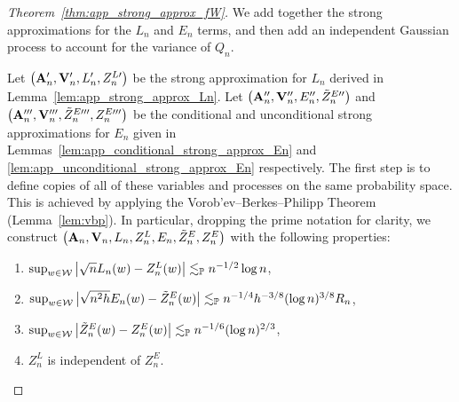 \begin{proof}[Theorem~\ref{thm:app_strong_approx_fW}]

  We add together the strong approximations
  for the $L_n$ and $E_n$ terms,
  and then add an independent Gaussian process
  to account for the variance of $Q_n$.


  Let $\big(\mathbf{A}_n', \mathbf{V}_n', L_n', Z_n^{L\prime}\big)$
  be the strong approximation for $L_n$
  derived in Lemma~\ref{lem:app_strong_approx_Ln}.
  Let $\big(\mathbf{A}_n'', \mathbf{V}_n'', E_n'', \tilde Z_n^{E\prime\prime}\big)$
  and
  $\big(\mathbf{A}_n''', \mathbf{V}_n''', \tilde Z_n^{E\prime\prime\prime}, Z_n^{E\prime\prime\prime}\big)$
  be the conditional and unconditional strong approximations for $E_n$
  given in Lemmas~\ref{lem:app_conditional_strong_approx_En}
  and \ref{lem:app_unconditional_strong_approx_En}
  respectively.
  The first step is to define copies of all of these variables
  and processes on the same probability space.
  This is achieved by applying the
  Vorob'ev--Berkes--Philipp Theorem
  (Lemma~\ref{lem:vbp}).
  In particular, dropping the prime notation for clarity,
  we construct
  $\big(\mathbf{A}_n, \mathbf{V}_n, L_n, Z_n^L, E_n, \tilde Z_n^E, Z_n^E\big)$
  with the following properties:
  \begin{enumerate}[label=(\roman*)]

    \item
      $\sup_{w \in \mathcal{W}}
      \big| \sqrt{n} L_n(w) -  Z_n^L(w)\big|
      \lesssim_{\mathbb{P}} n^{-1/2} \log n$,

    \item
      $\sup_{w \in \mathcal{W}}
      \big|\sqrt{n^2h} E_n(w) - \tilde Z^E_n(w) \big|
      \lesssim_{\mathbb{P}} n^{-1/4}  h^{-3/8} (\log n)^{3/8} R_n$,

    \item
      $\sup_{w \in \mathcal{W}}
      \big| \tilde Z^E_n(w) - Z^E_n(w) \big|
      \lesssim_{\mathbb{P}} n^{-1/6} (\log n)^{2/3}$,

    \item
      $Z_n^L$ is independent of $Z_n^E$.


\end{enumerate}
\end{proof}
